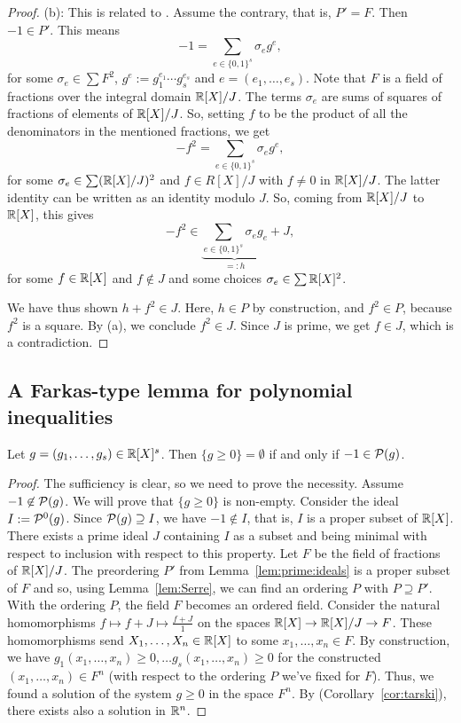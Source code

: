 \begin{proof}
(b): This is related to \cite[Prop.~2.1.6]{Marshall:2008}. Assume the contrary, that is, $P'= F$. Then $-1 \in P'$. This means
\[
	-1 = \sum_{e \in \{0,1\}^s} \sigma_e g^e ,
\]
for some $\sigma_e \in \sum F^2$, $g^e := g_1^{e_1} \cdots g_s^{e_s}$ and $e=(e_1,\ldots,e_s)$. Note that $F$ is a field of fractions over the integral domain $\mathbb{R}[X]/J$. The terms $\sigma_e$ are sums of squares of fractions of elements of $\mathbb{R}[X]/J$. So, setting $f$ to be the product of all the denominators in the mentioned fractions, we get
\[
	-f^2 = \sum_{e \in \{0,1\}^s} \sigma_e g^e,
\]
for some $\sigma_e \in \sum (\mathbb{R}[X]/J)^2$ and $f \in R[X]/J$ with $f \ne 0$ in $\mathbb{R}[X]/J$. The latter identity can be written as an identity modulo $J$. So, coming from $\mathbb{R}[X] / J$ to $\mathbb{R}[X]$, this gives
\[
	-f^2 \in \underbrace{\sum_{e \in \{0,1\}^s} \sigma_e g_e}_{=:h} + J,
\]
for some $f \in \mathbb{R}[X]$ and $f \not\in J$ and some choices $\sigma_e \in \sum \mathbb{R}[X]^2$. 

We have thus shown $h + f^2 \in J$. Here, $h \in P$ by construction, and $f^2 \in P$, because $f^2$ is a square. By (a), we conclude $f^2 \in J$. Since $J$ is prime, we get $f \in J$, which is a contradiction. 
\end{proof}


\subsection{A Farkas-type lemma for polynomial inequalities}

\begin{theorem} 
	\label{thm:farkas:pop}
	Let $g = (g_1,\ldots,g_s) \in \mathbb{R}[X]^s$. Then $\{g \ge 0\} = \emptyset$ if and only if $-1 \in \mathcal{P}(g)$. 
\end{theorem}
\begin{proof}
	The sufficiency is clear, so we need to prove the necessity. Assume $-1 \not\in \mathcal{P}(g)$. We will prove that $\{g \ge 0\}$ is non-empty. Consider the ideal $I := \mathcal{P}^0(g)$. Since $\mathcal{P}(g) \supseteq I$, we have $-1 \not\in I$, that is, $I$ is a proper subset of $\mathbb{R}[X]$. There exists a prime ideal $J$ containing $I$ as a subset and being minimal with respect to inclusion with respect to this property. Let $F$ be the field of fractions of $\mathbb{R}[X]/J$. The preordering $P'$ from Lemma~\ref{lem:prime:ideals} is a proper subset of $F$ and so, using Lemma~\ref{lem:Serre}, we can find an ordering $P$ with $P \supseteq P'$. With the ordering $P$, the field $F$ becomes an ordered field. Consider the natural homomorphisms $f \mapsto f+J \mapsto \frac{f+J}{1}$ on the spaces $\mathbb{R}[X] \to \mathbb{R}[X] / J \to F$. These homomorphisms send $X_1,\ldots,X_n \in \mathbb{R}[X]$ to some $x_1,\ldots,x_n \in F$. By construction, we have $g_1(x_1,\ldots,x_n) \ge 0,\ldots g_s(x_1,\ldots,x_n) \ge 0$ for the constructed $(x_1,\ldots,x_n) \in F^n$ (with respect to the ordering $P$ we've fixed for $F$). Thus, we found a solution of the system $g \ge 0$ in the space $F^n$. By  (Corollary~\ref{cor:tarski}), there exists also a solution in $\mathbb{R}^n$. 
\end{proof}

